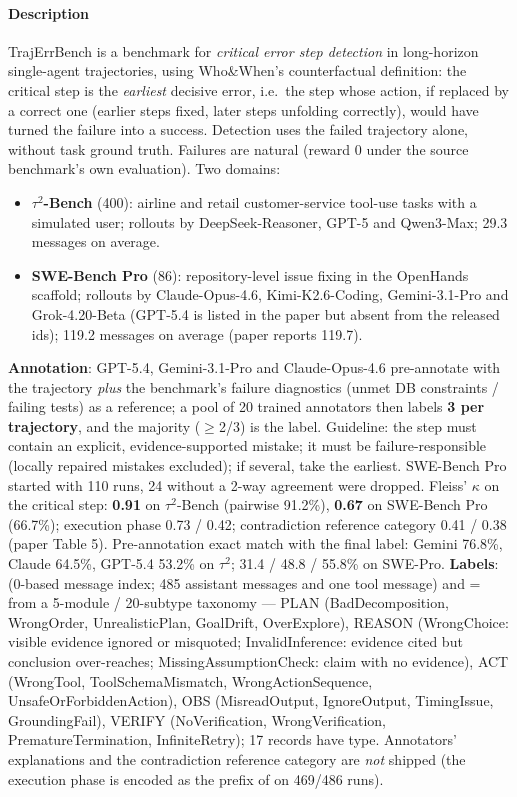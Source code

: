 \paragraph{Description} TrajErrBench is a benchmark for \emph{critical error step detection} in long-horizon single-agent trajectories, using Who\&When's counterfactual definition: the critical step is the \emph{earliest} decisive error, i.e.\ the step whose action, if replaced by a correct one (earlier steps fixed, later steps unfolding correctly), would have turned the failure into a success. Detection uses the failed trajectory alone, without task ground truth. Failures are natural (reward 0 under the source benchmark's own evaluation). Two domains:
\begin{itemize}
\item \textbf{$\tau^2$-Bench} (400): airline and retail customer-service tool-use tasks with a simulated user; rollouts by DeepSeek-Reasoner, GPT-5 and Qwen3-Max; 29.3 messages on average.
\item \textbf{SWE-Bench Pro} (86): repository-level issue fixing in the OpenHands scaffold; rollouts by Claude-Opus-4.6, Kimi-K2.6-Coding, Gemini-3.1-Pro and Grok-4.20-Beta (GPT-5.4 is listed in the paper but absent from the released ids); 119.2 messages on average (paper reports 119.7).
\end{itemize}
\textbf{Annotation}: GPT-5.4, Gemini-3.1-Pro and Claude-Opus-4.6 pre-annotate with the trajectory \emph{plus} the benchmark's failure diagnostics (unmet DB constraints / failing tests) as a reference; a pool of 20 trained annotators then labels \textbf{3 per trajectory}, and the majority ($\ge$2/3) is the label. Guideline: the step must contain an explicit, evidence-supported mistake; it must be failure-responsible (locally repaired mistakes excluded); if several, take the earliest. SWE-Bench Pro started with 110 runs, 24 without a 2-way agreement were dropped. Fleiss' $\kappa$ on the critical step: \textbf{0.91} on $\tau^2$-Bench (pairwise 91.2\%), \textbf{0.67} on SWE-Bench Pro (66.7\%); execution phase 0.73 / 0.42; contradiction reference category 0.41 / 0.38 (paper Table 5). Pre-annotation exact match with the final label: Gemini 76.8\%, Claude 64.5\%, GPT-5.4 53.2\% on $\tau^2$; 31.4 / 48.8 / 55.8\% on SWE-Pro. \textbf{Labels}:  (0-based message index; 485 assistant messages and one tool message) and  =  from a 5-module / 20-subtype taxonomy --- PLAN (BadDecomposition, WrongOrder, UnrealisticPlan, GoalDrift, OverExplore), REASON (WrongChoice: visible evidence ignored or misquoted; InvalidInference: evidence cited but conclusion over-reaches; MissingAssumptionCheck: claim with no evidence), ACT (WrongTool, ToolSchemaMismatch, WrongActionSequence, UnsafeOrForbiddenAction), OBS (MisreadOutput, IgnoreOutput, TimingIssue, GroundingFail), VERIFY (NoVerification, WrongVerification, PrematureTermination, InfiniteRetry); 17 records have  type. Annotators' explanations and the contradiction reference category are \emph{not} shipped (the execution phase is encoded as the  prefix of  on 469/486 runs).

